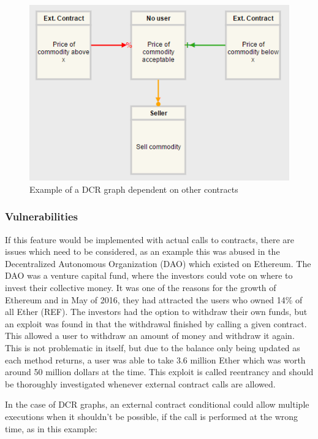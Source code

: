 \documentclass{article}
\begin{document}
			\begin{figure}[!ht]
				\centering
				\includegraphics[scale=0.7]{figures/external-contract-conditionals.png}
			 	\caption[External contract conditionals]
			 	{Example of a DCR graph dependent on other contracts}
			 	\label{fig:external-contract-conditionals}
			\end{figure}

			\subsubsection{Vulnerabilities}

			If this feature would be implemented with actual calls to contracts, there are issues which need to be considered, as an example this was abused in the Decentralized Autonomous Organization (DAO) which existed on Ethereum.			
			The DAO was a venture capital fund, where the investors could vote on where to invest their collective money.
			It was one of the reasons for the growth of Ethereum and in May of 2016, they had attracted the users who owned 14\% of all Ether (REF). 
			The investors had the option to withdraw their own funds, but an exploit was found in that the withdrawal finished by calling a given contract.
			This allowed a user to withdraw an amount of money and withdraw it again.
			This is not problematic in itself, but due to the balance only being updated as each method returns, a user was able to take 3.6 million Ether which was worth around 50 million dollars at the time.
			This exploit is called reentrancy and should be thoroughly investigated whenever external contract calls are allowed.

			In the case of DCR graphs, an external contract conditional could allow multiple executions when it shouldn't be possible, if the call is performed at the wrong time, as in this example:
\end{document}
